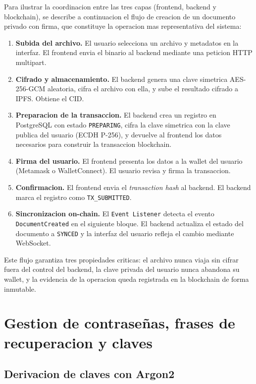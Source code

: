 \documentclass[11pt, a4paper]{article}
\begin{document}
Para ilustrar la coordinacion entre las tres capas (frontend, backend y blockchain), se describe a continuacion el flujo de creacion de un documento privado con firma, que constituye la operacion mas representativa del sistema:

\begin{enumerate}
    \item \textbf{Subida del archivo.} El usuario selecciona un archivo y metadatos en la interfaz. El frontend envia el binario al backend mediante una peticion HTTP multipart.
    \item \textbf{Cifrado y almacenamiento.} El backend genera una clave simetrica AES-256-GCM aleatoria, cifra el archivo con ella, y sube el resultado cifrado a IPFS. Obtiene el CID.
    \item \textbf{Preparacion de la transaccion.} El backend crea un registro en PostgreSQL con estado \texttt{PREPARING}, cifra la clave simetrica con la clave publica del usuario (ECDH P-256), y devuelve al frontend los datos necesarios para construir la transaccion blockchain.
    \item \textbf{Firma del usuario.} El frontend presenta los datos a la wallet del usuario (Metamask o WalletConnect). El usuario revisa y firma la transaccion.
    \item \textbf{Confirmacion.} El frontend envia el \textit{transaction hash} al backend. El backend marca el registro como \texttt{TX\_SUBMITTED}.
    \item \textbf{Sincronizacion on-chain.} El \texttt{Event Listener} detecta el evento \texttt{DocumentCreated} en el siguiente bloque. El backend actualiza el estado del documento a \texttt{SYNCED} y la interfaz del usuario refleja el cambio mediante WebSocket.
\end{enumerate}

Este flujo garantiza tres propiedades criticas: el archivo nunca viaja sin cifrar fuera del control del backend, la clave privada del usuario nunca abandona su wallet, y la evidencia de la operacion queda registrada en la blockchain de forma inmutable.

\section{Gestion de contraseñas, frases de recuperacion y claves}

\subsection{Derivacion de claves con Argon2}
\end{document}
